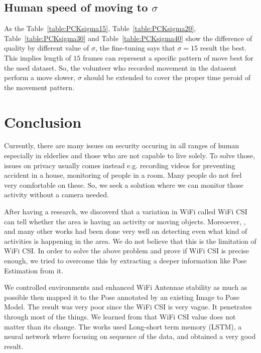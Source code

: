 \documentclass[10pt,letterpaper]{article}
\begin{document}
\subsection*{Human speed of moving to $\sigma$}

As the Table~\ref{table:PCKsigma15}, Table~\ref{table:PCKsigma20}, Table~\ref{table:PCKsigma30} and  Table~\ref{table:PCKsigma40} show the difference of quality by different value of $\sigma$, the fine-tuning says that $\sigma=15$ result the best. This implies length of $15$ frames can represent a specific pattern of move best for the used dataset. So, the volunteer who recorded movement in the datasent perform a move slower, $\sigma$ should be extended to cover the proper time peroid of the movement pattern.


 	\section*{Conclusion}

	Currently, there are many issues on security occuring in all ranges of human especially in elderlies and those who are not capable to live solely. To solve those, issues on privacy usually comes instead e.g. recording videos for preventing accident in a house, monitoring of people in a room. Many people do not feel very comfortable on these. So, we seek a solution where we can monitor those activity without a camera needed. 
	
	After having a research, we discoverd that a variation in WiFi called WiFi CSI can tell whether the area is having an activity or moving objects. Moreoever, \cite{chowdhuryTZ}, \cite{zouH} and many other works had been done very well on detecting even what kind of activities is happening in the area. We do not believe that this is the limitation of WiFi CSI. In order to solve the above problem and prove if WiFi CSI is precise enough, we tried to overcome this by extracting a deeper information like Pose Estimation from it. 
	
	We controlled environments and enhanced WiFi Antennae stability as much as possible then mapped it to the Pose annotated by an existing Image to Pose Model. The result was very poor since the WiFi CSI is very vague. It penetrates through most of the things. We learned from \cite{bib20} that WiFi CSI value does not matter than its change. The works used Long-short term memory (LSTM), a neural network where focusing on sequence of the data, and obtained a very good result. 
	
\end{document}

